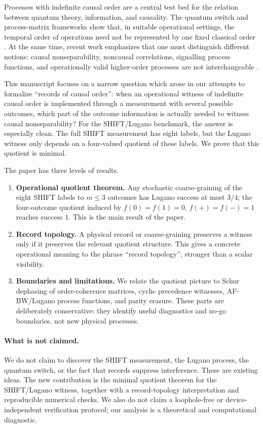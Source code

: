 \documentclass[11pt,a4paper]{article}
\begin{document}
Processes with indefinite causal order are a central test bed for the relation between quantum theory, information, and causality.  The quantum switch and process-matrix frameworks show that, in suitable operational settings, the temporal order of operations need not be represented by one fixed classical order \cite{Chiribella2009,Oreshkov2012,Araujo2015}.  At the same time, recent work emphasizes that one must distinguish different notions: causal nonseparability, noncausal correlations, signalling process functions, and operationally valid higher-order processes are not interchangeable \cite{KunjwalBaumeler2023,Steffinlongo2025,LiuOreshkov2025}.

This manuscript focuses on a narrow question which arose in our attempts to formalize ``records of causal order'': when an operational witness of indefinite causal order is implemented through a measurement with several possible outcomes, which part of the outcome information is actually needed to witness causal nonseparability?  For the SHIFT/Lugano benchmark, the answer is especially clean.  The full SHIFT measurement has eight labels, but the Lugano witness only depends on a four-valued quotient of these labels.  We prove that this quotient is minimal.

The paper has three levels of results.
\begin{enumerate}[leftmargin=2em]
    \item \textbf{Operational quotient theorem.}  Any stochastic coarse-graining of the eight SHIFT labels to $m\le 3$ outcomes has Lugano success at most $3/4$; the four-outcome quotient induced by $f(0)=f(1)=0$, $f(+)=f(-)=1$ reaches success $1$.  This is the main result of the paper.
    \item \textbf{Record topology.}  A physical record or coarse-graining preserves a witness only if it preserves the relevant quotient structure.  This gives a concrete operational meaning to the phrase ``record topology'', stronger than a scalar visibility.
    \item \textbf{Boundaries and limitations.}  We relate the quotient picture to Schur dephasing of order-coherence matrices, cyclic precedence witnesses, AF-BW/Lugano process functions, and parity erasure.  These parts are deliberately conservative: they identify useful diagnostics and no-go boundaries, not new physical processes.
\end{enumerate}

\paragraph{What is not claimed.}
We do not claim to discover the SHIFT measurement, the Lugano process, the quantum switch, or the fact that records suppress interference.  These are existing ideas.  The new contribution is the minimal quotient theorem for the SHIFT/Lugano witness, together with a record-topology interpretation and reproducible numerical checks.  We also do not claim a loophole-free or device-independent verification protocol; our analysis is a theoretical and computational diagnostic.
\end{document}
